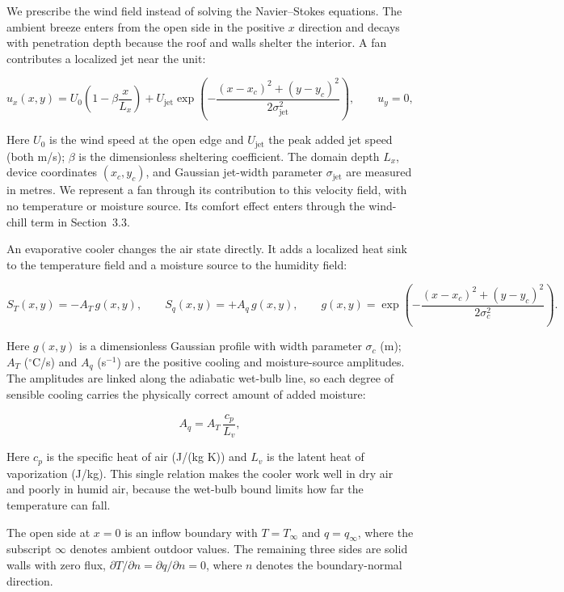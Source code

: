 \documentclass[11pt]{article}
\begin{document}
We prescribe the wind field instead of solving the Navier--Stokes equations. The
ambient breeze enters from the open side in the positive $x$ direction and decays
with penetration depth because the roof and walls shelter the interior. A fan
contributes a localized jet near the unit:

\begin{equation}
u_x(x,y) = U_0\left(1-\beta\frac{x}{L_x}\right)
+ U_{\mathrm{jet}}\exp\!\left(-\frac{(x-x_c)^2+(y-y_c)^2}{2\sigma_{\mathrm{jet}}^2}\right),
\qquad u_y=0,
\label{eq:wind}
\end{equation}

Here $U_0$ is the wind speed at the open edge and $U_{\mathrm{jet}}$ the peak
added jet speed (both m/s); $\beta$ is the dimensionless sheltering coefficient.
The domain depth $L_x$, device coordinates $(x_c,y_c)$, and Gaussian jet-width
parameter $\sigma_{\mathrm{jet}}$ are measured in metres. We represent a fan
through its contribution to this velocity field, with no temperature or moisture
source. Its comfort effect enters through the wind-chill term in Section~3.3.

An evaporative cooler changes the air state directly. It adds a localized heat
sink to the temperature field and a moisture source to the humidity field:

\begin{equation}
S_T(x,y) = -A_T\,g(x,y), \qquad
S_q(x,y) = +A_q\,g(x,y), \qquad
g(x,y)=\exp\!\left(-\frac{(x-x_c)^2+(y-y_c)^2}{2\sigma_c^2}\right).
\label{eq:source}
\end{equation}

Here $g(x,y)$ is a dimensionless Gaussian profile with width parameter
$\sigma_c$ (m); $A_T$ ($^{\circ}$C/s) and $A_q$ (s$^{-1}$) are the positive
cooling and moisture-source amplitudes. The amplitudes are linked along the
adiabatic wet-bulb line, so each degree of sensible cooling carries the physically
correct amount of added moisture:

\begin{equation}
A_q = A_T\,\frac{c_p}{L_v},
\label{eq:aq}
\end{equation}

Here $c_p$ is the specific heat of air (J/(kg K)) and $L_v$ is the latent heat
of vaporization (J/kg).
This single relation makes the cooler work well in dry air and poorly in humid
air, because the wet-bulb bound limits how far the temperature can fall.

The open side at $x=0$ is an inflow boundary with $T=T_\infty$ and $q=q_\infty$,
where the subscript $\infty$ denotes ambient outdoor values. The remaining three
sides are solid walls with zero flux,
$\partial T/\partial n=\partial q/\partial n=0$, where $n$ denotes the
boundary-normal direction.
\end{document}
